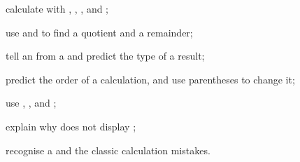 \begin{jesais}
\item calculate with \py{+}, \py{-}, \py{*}, \py{/} and \py{**};
\item use \py{//} and \py{\%} to find a quotient and a remainder;
\item tell an  from a  and predict the type of a result;
\item predict the order of a calculation, and use parentheses to change it;
\item use , ,  and ;
\item explain why  does not display ;
\item recognise a  and the classic calculation mistakes.
\end{jesais}
